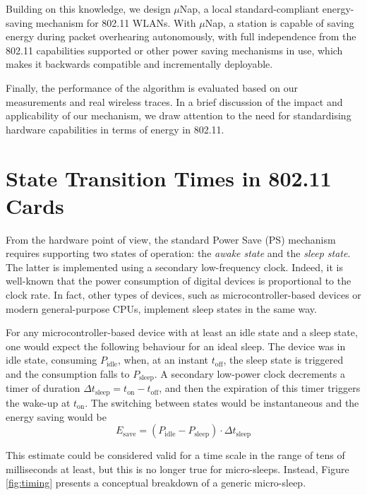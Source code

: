 \documentclass[twoside,nohyper]{tufte-book}
\begin{document}
Building on this knowledge, we design \(\mu\)Nap, a local standard-compliant energy-saving mechanism for 802.11 WLANs. With \(\mu\)Nap, a station is capable of saving energy during packet overhearing autonomously, with full independence from the 802.11 capabilities supported or other power saving mechanisms in use, which makes it backwards compatible and incrementally deployable.

Finally, the performance of the algorithm is evaluated based on our measurements and real wireless traces. In a brief discussion of the impact and applicability of our mechanism, we draw attention to the need for standardising hardware capabilities in terms of energy in 802.11.

\hypertarget{state-transition-times}{%
\section{State Transition Times in 802.11 Cards}\label{state-transition-times}}

From the hardware point of view, the standard Power Save (PS) mechanism requires supporting two states of operation: the \emph{awake state} and the \emph{sleep state}. The latter is implemented using a secondary low-frequency clock. Indeed, it is well-known that the power consumption of digital devices is proportional to the clock rate\cite[0pt]{Zhang2012}. In fact, other types of devices, such as microcontroller-based devices or modern general-purpose CPUs, implement sleep states in the same way.

For any microcontroller-based device with at least an idle state and a sleep state, one would expect the following behaviour for an ideal sleep. The device was in idle state, consuming \(P_\mathrm{idle}\), when, at an instant \(t_\mathrm{off}\), the sleep state is triggered and the consumption falls to \(P_\mathrm{sleep}\). A secondary low-power clock decrements a timer of duration \(\Delta t_\mathrm{sleep} = t_\mathrm{on} - t_\mathrm{off}\), and then the expiration of this timer triggers the wake-up at \(t_\mathrm{on}\). The switching between states would be instantaneous and the energy saving would be
%
\begin{equation}
 E_\mathrm{save} = (P_\mathrm{idle} - P_\mathrm{sleep}) \cdot \Delta t_\mathrm{sleep}
 \label{eq:idealsleep}
\end{equation}
%


This estimate could be considered valid for a time scale in the range of tens of milliseconds at least, but this is no longer true for micro-sleeps. Instead, Figure \ref{fig:timing} presents a conceptual breakdown of a generic micro-sleep.
\end{document}
